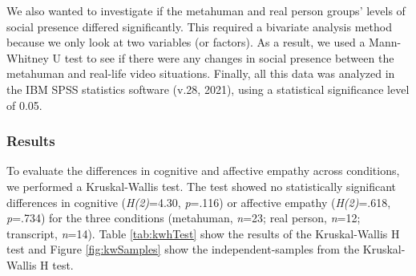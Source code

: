 We also wanted to investigate if the metahuman and real person groups' levels of social presence differed significantly. This required a bivariate analysis method because we only look at two variables (or factors). As a result, we used a Mann-Whitney U test to see if there were any changes in social presence between the metahuman and real-life video situations. Finally, all this data was analyzed in the IBM SPSS statistics software (v.28, 2021), using a statistical significance level of 0.05.

\subsubsection{Results}
To evaluate the differences in cognitive and affective empathy across conditions, we performed a Kruskal-Wallis test. The test showed no statistically significant differences in cognitive (\textit{H(2)}=4.30, \textit{p}=.116) or affective empathy (\textit{H(2)}=.618, \textit{p}=.734) for the three conditions (metahuman, \textit{n}=23; real person, \textit{n}=12; transcript, \textit{n}=14). Table \ref{tab:kwhTest} show the results of the Kruskal-Wallis H test and Figure \ref{fig:kwSamples} show the independent-samples from the Kruskal-Wallis H test.

